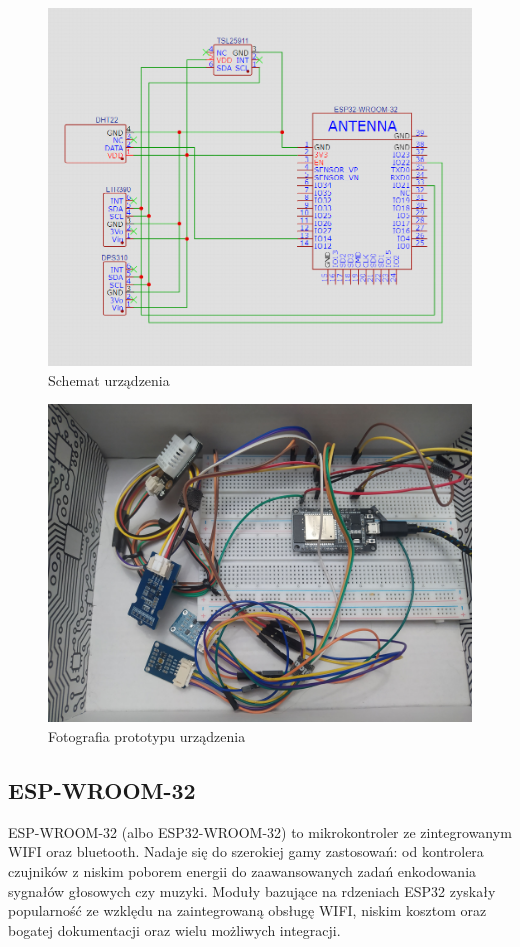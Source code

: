 \documentclass[12pt,a4paper]{article}
\begin{document}
\begin{figure}[H]
    \centering
    \includegraphics[width=\textwidth]{device-schematic.png}
    \caption{Schemat urządzenia}
    \label{device-schematic}
\end{figure}

\begin{figure}[H]
    \centering
    \includegraphics[width=\textwidth]{device-image.jpg}
    \caption{Fotografia prototypu urządzenia}
    \label{device-image}
\end{figure}

\subsection{ESP-WROOM-32}
ESP-WROOM-32 (albo ESP32-WROOM-32) to mikrokontroler ze zintegrowanym WIFI oraz bluetooth. Nadaje się do szerokiej gamy zastosowań:
od kontrolera czujników z niskim poborem energii do zaawansowanych zadań enkodowania sygnałów głosowych czy muzyki. Moduły bazujące na rdzeniach ESP32 zyskały popularność ze wzklędu na zaintegrowaną obsługę WIFI, 
niskim kosztom oraz bogatej dokumentacji oraz wielu możliwych integracji.
\end{document}
